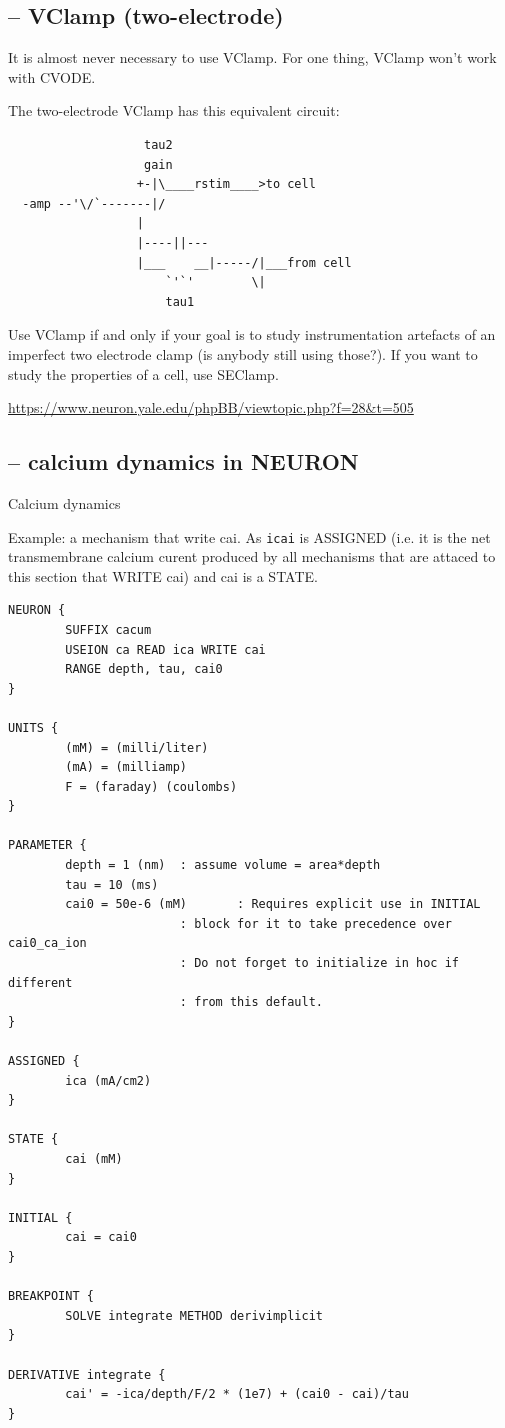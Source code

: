 \subsection{-- VClamp (two-electrode)}
\label{sec:VClamp}

It is almost never necessary to use VClamp. For one thing, VClamp won't work with 
CVODE.

The two-electrode VClamp has this  equivalent circuit: 
\begin{verbatim}
                   tau2
                   gain
                  +-|\____rstim____>to cell
  -amp --'\/`-------|/
                  |
                  |----||---
                  |___    __|-----/|___from cell
                      `'`'        \|
                      tau1
\end{verbatim}

Use VClamp if and only if your goal is to study instrumentation artefacts of an imperfect 
two electrode clamp (is anybody still using those?). If you want to study the
properties of a cell, use SEClamp.


\url{https://www.neuron.yale.edu/phpBB/viewtopic.php?f=28&t=505}

\subsection{-- calcium dynamics in NEURON}
\label{sec:calcium-dynamics-NEURON}

Calcium dynamics

Example: a mechanism that write cai. As \verb!icai! is ASSIGNED (i.e. it is
the net transmembrane calcium curent produced by all mechanisms that are attaced
to this section that WRITE cai) and cai is a STATE.

\begin{verbatim}
NEURON {
        SUFFIX cacum
        USEION ca READ ica WRITE cai
        RANGE depth, tau, cai0
}

UNITS {
        (mM) = (milli/liter)
        (mA) = (milliamp)
        F = (faraday) (coulombs)
}

PARAMETER {
        depth = 1 (nm)  : assume volume = area*depth
        tau = 10 (ms)
        cai0 = 50e-6 (mM)       : Requires explicit use in INITIAL
                        : block for it to take precedence over cai0_ca_ion
                        : Do not forget to initialize in hoc if different
                        : from this default.
}

ASSIGNED {
        ica (mA/cm2)
}

STATE {
        cai (mM)
}

INITIAL {
        cai = cai0
}

BREAKPOINT {
        SOLVE integrate METHOD derivimplicit
}

DERIVATIVE integrate {
        cai' = -ica/depth/F/2 * (1e7) + (cai0 - cai)/tau
}
\end{verbatim}

